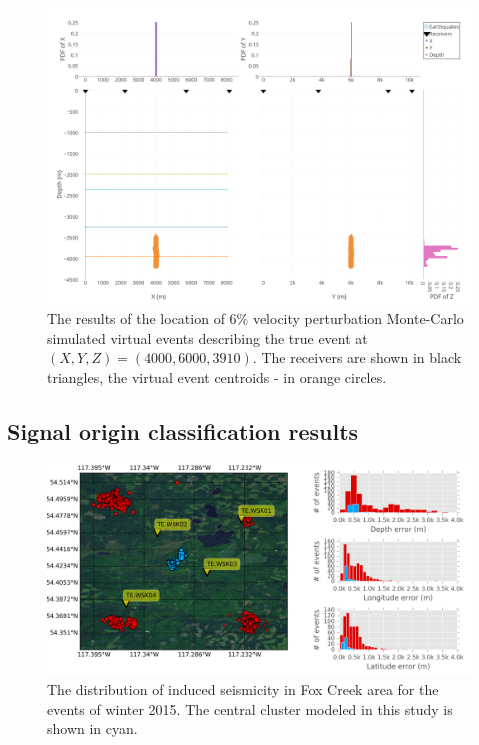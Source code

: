 \documentclass[letterpaper,11pt]{article}
\begin{document}
\begin{figure}[htb]
\begin{center}
\includegraphics[width=0.6\linewidth,angle=0]{./AntonBiryukov_bibtex/Figure1_6pct.png}
\end{center}
\vspace{-4mm}
\caption{The results of the location of 6\% velocity perturbation Monte-Carlo simulated virtual events describing the true event at $(X,Y,Z) = (4000,6000,3910)$. The receivers are shown in black triangles, the virtual event centroids - in orange circles.}
\label{fig:sigma6}
\end{figure}

\subsection*{Signal origin classification results}
\begin{figure}[htb]
\begin{center}
\includegraphics[width=0.75\linewidth,angle=0]{./AntonBiryukov_bibtex/figure_map_a.png}
\end{center}
\vspace{-4mm}
\caption{The distribution of induced seismicity in Fox Creek area for the events of winter 2015. The central cluster modeled in this study is shown in cyan.}
\label{fig:map_clusters}
\end{figure}
\end{document}
